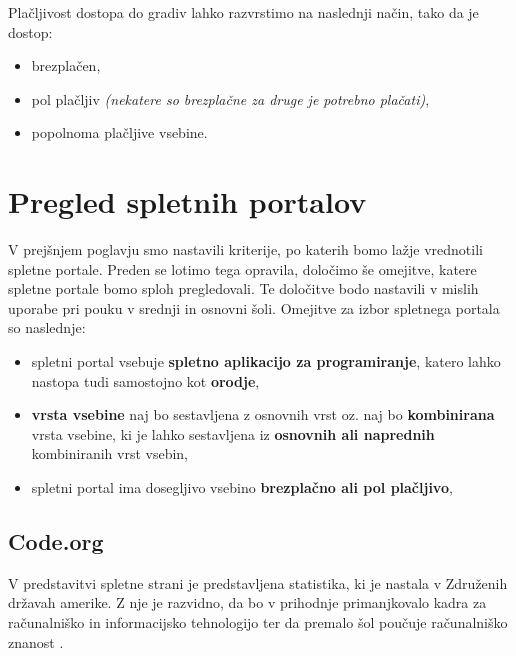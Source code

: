 Plačljivost dostopa do gradiv lahko razvrstimo na naslednji način,
tako da je dostop:

\begin{itemize}
  \tightlist
\item brezplačen,
\item pol plačljiv \emph{(nekatere so brezplačne za druge je potrebno
    plačati)},
\item popolnoma plačljive vsebine.
\end{itemize}


\section{Pregled spletnih portalov}
\label{sec:pregled_spletnih_port}

V prejšnjem poglavju smo nastavili kriterije, po katerih bomo lažje
vrednotili spletne portale. Preden se lotimo tega opravila, določimo
še omejitve, katere spletne portale bomo sploh pregledovali. Te
določitve bodo nastavili v mislih uporabe pri pouku v srednji in
osnovni šoli. Omejitve za izbor spletnega portala so naslednje:

\begin{itemize}
  \tightlist
\item spletni portal vsebuje \textbf{spletno aplikacijo za
    programiranje}, katero lahko nastopa tudi samostojno kot
  \textbf{orodje},
\item \textbf{vrsta vsebine} naj bo sestavljena z osnovnih vrst
  oz. naj bo \textbf{kombinirana} vrsta vsebine, ki je lahko
  sestavljena iz \textbf{osnovnih ali naprednih} kombiniranih vrst vsebin,
\item spletni portal ima dosegljivo vsebino \textbf{brezplačno ali pol
  plačljivo},
\end{itemize}

\subsection{Code.org}
\label{sec:Code.org}


V predstavitvi spletne strani je predstavljena statistika, ki je
nastala v Združenih državah amerike. Z nje je razvidno, da bo v
prihodnje primanjkovalo kadra za računalniško in informacijsko
tehnologijo ter da premalo šol poučuje računalniško znanost
\cite{web:code.org:promote}. 

